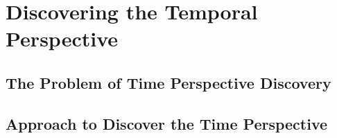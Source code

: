 \chapter{Discovering the Temporal Perspective}


%
%



\section{The Problem of Time Perspective Discovery}


\section{Approach to Discover the Time Perspective}







